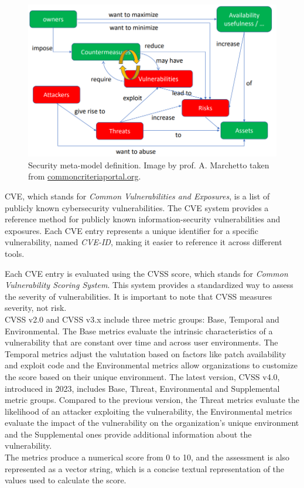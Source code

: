 \begin{figure}[ht]
  \centering
  \includegraphics[scale=0.6]{chapters/02/assets/security-meta-model-def}
  \caption[Security meta-model definition. Image by prof. A. Marchetto taken from commoncriteriaportal.org.]{Security meta-model definition. Image by prof. A. Marchetto taken from \url{commoncriteriaportal.org}.}
  \label{fig:security-meta-model-def}
\end{figure}

CVE, which stands for \textit{Common Vulnerabilities and Exposures}, is a list of publicly known cybersecurity vulnerabilities. The CVE system provides a reference method for publicly known information-security vulnerabilities and exposures. Each CVE entry represents a unique identifier for a specific vulnerability, named \textit{CVE-ID}, making it easier to reference it across different tools.

Each CVE entry is evaluated using the CVSS score, which stands for \textit{Common Vulnerability Scoring System}. This system provides a standardized way to assess the severity of vulnerabilities. It is important to note that CVSS measures severity, not risk. \\
CVSS v2.0 and CVSS v3.x include three metric groups: Base, Temporal and Environmental. The Base metrics evaluate the intrinsic characteristics of a vulnerability that are constant over time and across user environments. The Temporal metrics adjust the valutation based on factors like patch availability and exploit code and the Environmental metrics allow organizations to customize the score based on their unique environment. The latest version, CVSS v4.0, introduced in 2023, includes Base, Threat, Environmental and Supplemental metric groups. Compared to the previous version, the Threat metrics evaluate the likelihood of an attacker exploiting the vulnerability, the Environmental metrics evaluate the impact of the vulnerability on the organization's unique environment and the Supplemental ones provide additional information about the vulnerability.~\cite{cvss-4-spec}\\
The metrics produce a numerical score from 0 to 10, and the assessment is also represented as a vector string, which is a concise textual representation of the values used to calculate the score.~\cite{cvss-metrics}

